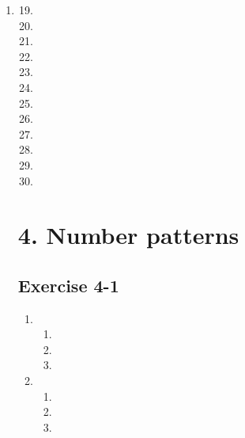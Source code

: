 \begin{enumerate}[label=\textbf{\arabic*}., itemsep=5pt]
\item %
\begin{multicols}{2}
\begin{enumerate}[label=\textbf{(\alph*)}, itemsep=7pt]
\setcounter{enumi}{18}
\item %
\item %
\item %
\item %
\item %
\item %
\item %
\item %
\item %
\item %
\item %
\item %
\end{enumerate}
\end{multicols}



\section {4. Number patterns}
\subsection{Exercise 4-1} %

\begin{enumerate}[noitemsep, label=\textbf{\arabic*}. ] 
\item %

  \begin{enumerate} [noitemsep, label=\textbf{(\alph*)} ]
  \item %
  \item %
  \item %
  \end{enumerate}
 \item %
  \begin{enumerate} [noitemsep, label=\textbf{(\alph*)} ]
  \item %
  \item %
  \item %
  \end{enumerate}
     

\end{enumerate}
\end{enumerate}
